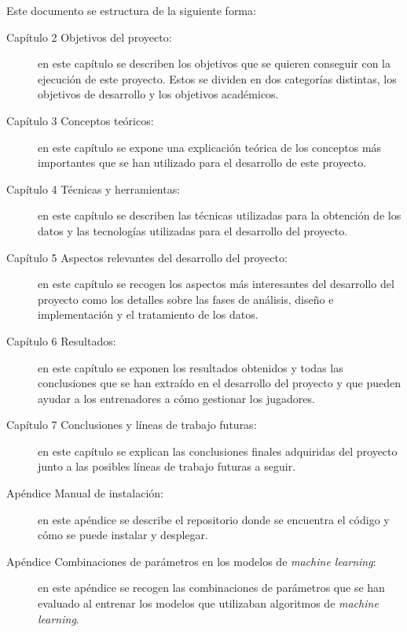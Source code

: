 Este documento se estructura de la siguiente forma:
\begin{description}

\item[Capítulo 2 Objetivos del proyecto:] en este capítulo se describen los objetivos que se quieren conseguir con la ejecución de este proyecto. Estos se dividen en dos categorías distintas,
los objetivos de desarrollo y los objetivos académicos.


\item[Capítulo 3 Conceptos teóricos:] en este capítulo se expone una explicación teórica de los conceptos más importantes que se han utilizado para el desarrollo de este proyecto.

\item[Capítulo 4 Técnicas y herramientas:] en este capítulo se describen las técnicas utilizadas para la obtención de los datos y las tecnologías utilizadas para el desarrollo del proyecto.


\item[Capítulo 5 Aspectos relevantes del desarrollo del proyecto:] en este capítulo se recogen los aspectos más interesantes del desarrollo del proyecto como los detalles sobre las fases de análisis, diseño e implementación y el tratamiento de los datos.


\item[Capítulo 6 Resultados:] en este capítulo se exponen los resultados obtenidos y todas las conclusiones que se han extraído en el desarrollo del proyecto y que pueden ayudar a los entrenadores a cómo gestionar los jugadores.


\item[Capítulo 7 Conclusiones y líneas de trabajo futuras:] en este capítulo se explican las conclusiones finales adquiridas del proyecto junto a las posibles líneas de trabajo futuras a seguir.

\item[Apéndice Manual de instalación:] en este apéndice se describe el repositorio donde se encuentra el código y cómo se puede instalar y desplegar.

\item[Apéndice Combinaciones de parámetros en los modelos de \textit{machine learning}:] en este apéndice se recogen las combinaciones de parámetros que se han evaluado al entrenar los modelos que utilizaban algoritmos de \textit{machine learning}.

\end{description}



